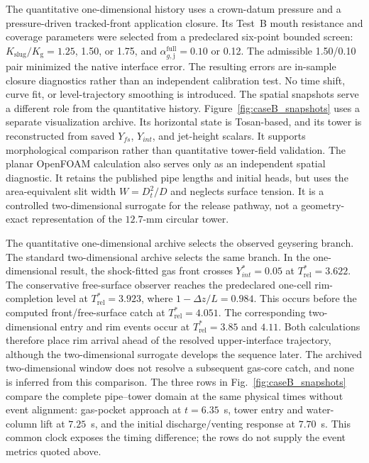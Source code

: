 The quantitative one-dimensional history uses a crown-datum pressure and a
pressure-driven tracked-front application closure. Its
Test~B mouth resistance and coverage
parameters were selected from a predeclared six-point bounded screen:
$K_{\mathrm{slug}}/K_{\mathrm{g}}=1.25$, 1.50, or 1.75, and
$\alpha_{g,\mathrm{j}}^{\mathrm{full}}=0.10$ or 0.12. The admissible 1.50/0.10
pair minimized the native interface error. The resulting errors are in-sample
closure diagnostics rather than an independent calibration test. No time
shift, curve fit, or level-trajectory smoothing is introduced.
The spatial snapshots serve a different role from the quantitative history.
Figure~\ref{fig:caseB_snapshots} uses a separate visualization archive. Its
horizontal state is Tosan-based, and its tower is reconstructed from saved
$Y_{fs}$, $Y_{int}$, and jet-height scalars. It supports morphological
comparison rather than quantitative tower-field validation. The planar
OpenFOAM calculation also serves only as an independent spatial diagnostic. It
retains the published pipe lengths and initial heads, but uses the
area-equivalent slit width $W=D_t^2/D$ and neglects surface tension. It is a
controlled two-dimensional surrogate for the release pathway, not a
geometry-exact representation of the $12.7$-mm circular tower.

The quantitative one-dimensional archive selects the observed geysering
branch. The standard two-dimensional archive selects the same branch. In the
one-dimensional result, the shock-fitted gas front crosses
$Y^{*}_{int}=0.05$ at $T_{\mathrm{rel}}^{*}=3.622$. The conservative
free-surface observer reaches the predeclared one-cell rim-completion level at
$T_{\mathrm{rel}}^{*}=3.923$, where $1-\Delta z/L=0.984$. This occurs before the
computed front/free-surface catch at $T_{\mathrm{rel}}^{*}=4.051$. The
corresponding two-dimensional entry and rim events occur at
$T_{\mathrm{rel}}^{*}=3.85$ and $4.11$. Both calculations therefore place rim
arrival ahead of the resolved upper-interface trajectory, although the
two-dimensional surrogate develops the sequence later. The archived
two-dimensional window does not resolve a subsequent gas-core catch, and none
is inferred from this comparison. The three rows in
Fig.~\ref{fig:caseB_snapshots} compare the complete pipe--tower domain at the
same physical times without event alignment: gas-pocket approach at
$t=6.35$~s, tower entry and water-column lift at $7.25$~s, and the initial
discharge/venting response at $7.70$~s. This common clock exposes the timing
difference; the rows do not supply the event metrics quoted above.

